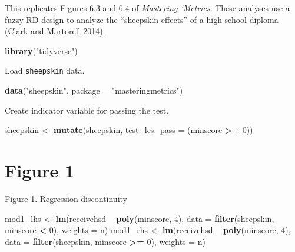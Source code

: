 \documentclass[]{book}
\newenvironment{Shaded}{\begin{snugshade}}{\end{snugshade}}
\newcommand{\DataTypeTok}[1]{\textcolor[rgb]{0.13,0.29,0.53}{#1}}
\newcommand{\DecValTok}[1]{\textcolor[rgb]{0.00,0.00,0.81}{#1}}
\newcommand{\KeywordTok}[1]{\textcolor[rgb]{0.13,0.29,0.53}{\textbf{#1}}}
\newcommand{\NormalTok}[1]{#1}
\newcommand{\OperatorTok}[1]{\textcolor[rgb]{0.81,0.36,0.00}{\textbf{#1}}}
\newcommand{\StringTok}[1]{\textcolor[rgb]{0.31,0.60,0.02}{#1}}
\theoremstyle{definition}
\theoremstyle{definition}
\theoremstyle{definition}
\theoremstyle{remark}
\begin{document}
This replicates Figures 6.3 and 6.4 of \emph{Mastering 'Metrics}. These
analyses use a fuzzy RD design to analyze the ``sheepskin effects'' of a
high school diploma (Clark and Martorell 2014).

\begin{Shaded}
\begin{Highlighting}[]
\KeywordTok{library}\NormalTok{(}\StringTok{"tidyverse"}\NormalTok{)}
\end{Highlighting}
\end{Shaded}

Load \texttt{sheepskin} data.

\begin{Shaded}
\begin{Highlighting}[]
\KeywordTok{data}\NormalTok{(}\StringTok{"sheepskin"}\NormalTok{, }\DataTypeTok{package =} \StringTok{"masteringmetrics"}\NormalTok{)}
\end{Highlighting}
\end{Shaded}

Create indicator variable for passing the test.

\begin{Shaded}
\begin{Highlighting}[]
\NormalTok{sheepskin <-}\StringTok{ }\KeywordTok{mutate}\NormalTok{(sheepskin, }\DataTypeTok{test_lcs_pass =}\NormalTok{ (minscore }\OperatorTok{>=}\StringTok{ }\DecValTok{0}\NormalTok{))}
\end{Highlighting}
\end{Shaded}

\hypertarget{figure-1}{%
\section{Figure 1}\label{figure-1}}

Figure 1. Regression discontinuity

\begin{Shaded}
\begin{Highlighting}[]
\NormalTok{mod1_lhs <-}\StringTok{ }\KeywordTok{lm}\NormalTok{(receivehsd }\OperatorTok{~}\StringTok{ }\KeywordTok{poly}\NormalTok{(minscore, }\DecValTok{4}\NormalTok{),}
               \DataTypeTok{data =} \KeywordTok{filter}\NormalTok{(sheepskin, minscore }\OperatorTok{<}\StringTok{ }\DecValTok{0}\NormalTok{), }\DataTypeTok{weights =}\NormalTok{ n)}
\NormalTok{mod1_rhs <-}\StringTok{ }\KeywordTok{lm}\NormalTok{(receivehsd }\OperatorTok{~}\StringTok{ }\KeywordTok{poly}\NormalTok{(minscore, }\DecValTok{4}\NormalTok{),}
               \DataTypeTok{data =} \KeywordTok{filter}\NormalTok{(sheepskin, minscore }\OperatorTok{>=}\StringTok{ }\DecValTok{0}\NormalTok{), }\DataTypeTok{weights =}\NormalTok{ n)}
\end{Highlighting}
\end{Shaded}
\end{document}
